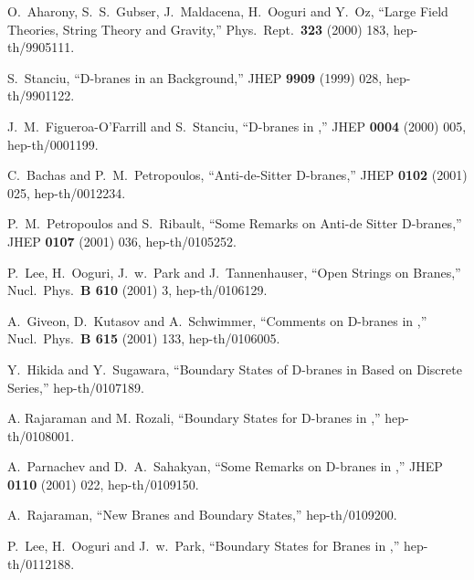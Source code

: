 \documentclass[a4paper,12pt]{article}
\begin{document}
\begin{thebibliography}{99}

O.~Aharony, S.~S.~Gubser, J.~Maldacena, H.~Ooguri and Y.~Oz,
``Large \coordHE{} Field Theories, String Theory and Gravity,''
Phys.\ Rept.\  {\bf 323} (2000) 183,
hep-th/9905111. 

S.~Stanciu,
``D-branes in an \coordHE{} Background,''
JHEP {\bf 9909} (1999) 028,
hep-th/9901122.

J.~M.~Figueroa-O'Farrill and S.~Stanciu,
``D-branes in \coordHE{},''
JHEP {\bf 0004} (2000) 005,
hep-th/0001199.

C.~Bachas and P.~M.~Petropoulos,
``Anti-de-Sitter D-branes,''
JHEP {\bf 0102} (2001) 025,
hep-th/0012234.

P.~M.~Petropoulos and S.~Ribault,
``Some Remarks on Anti-de Sitter D-branes,''
JHEP {\bf 0107} (2001) 036, hep-th/0105252.

P.~Lee, H.~Ooguri, J.~w.~Park and J.~Tannenhauser,
``Open Strings on \coordHE{} Branes,''
Nucl.\ Phys.\ {\bf B 610} (2001) 3, hep-th/0106129.

A.~Giveon, D.~Kutasov and A.~Schwimmer,
``Comments on D-branes in \coordHE{},''
Nucl.\ Phys.\ {\bf B 615} (2001) 133, hep-th/0106005.

Y.~Hikida and Y.~Sugawara,
``Boundary States of D-branes in \coordHE{} Based on Discrete Series,''
hep-th/0107189.

A. Rajaraman and M. Rozali,
``Boundary States for D-branes in \coordHE{},'' hep-th/0108001.

A.~Parnachev and D.~A.~Sahakyan,
``Some Remarks on D-branes in \coordHE{},''
JHEP {\bf 0110} (2001) 022, hep-th/0109150.


A.~Rajaraman,
``New \coordHE{} Branes and Boundary States,''
hep-th/0109200.

P.~Lee, H.~Ooguri and J.~w.~Park,
``Boundary States for \coordHE{} Branes in \coordHE{},'' hep-th/0112188.


\end{thebibliography}
\end{document}
